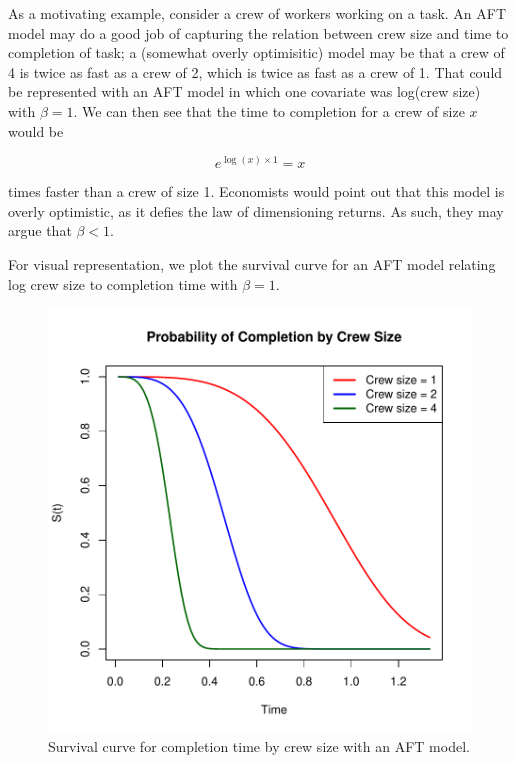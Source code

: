 \documentclass[a4paper]{article}
\begin{document}
  As a motivating example, consider a crew of workers working on a task. An AFT model may do a good job of capturing the relation between crew size and time to completion of task; a (somewhat overly optimisitic) model may be that a crew of 4 is twice as fast as a crew of 2, which is twice as fast as a crew of 1. That could be represented with an AFT model in which one covariate was log(crew size) with $\beta = 1$. We can then see that the time to completion for a crew of size $x$ would be 
  
  \[
  e^{\log(x) \times 1} = x
  \]

  times faster than a crew of size 1. Economists would point out that this model is overly optimistic, as it defies the law of dimensioning returns. As such, they may argue that $\beta < 1$. 
  
  For visual representation, we plot the survival curve for an AFT model relating log crew size to completion time with $\beta = 1$. 
  
\begin{figure}[H]
\begin{center}
\includegraphics{StatisticalBackground-010}
\caption{Survival curve for completion time by crew size with an AFT model.}
\label{fig:AFTcrew}
\end{center}
\end{figure}
\end{document}
